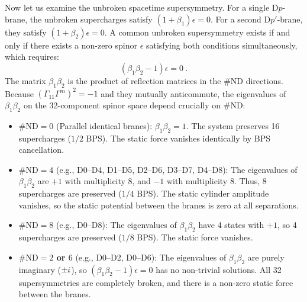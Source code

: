 Now let us examine the unbroken spacetime supersymmetry. For a single D$p$-brane, the unbroken supercharges satisfy $(1 + \beta_1)\epsilon = 0$. For a second D$p'$-brane, they satisfy $(1 + \beta_2)\epsilon = 0$. A common unbroken supersymmetry exists if and only if there exists a non-zero spinor $\epsilon$ satisfying both conditions simultaneously, which requires:
\begin{equation}
	(\beta_1\beta_2 - 1)\epsilon = 0 \:.
\end{equation}
The matrix $\beta_1\beta_2$ is the product of reflection matrices in the $\#\mathrm{ND}$ directions. Because $(\Gamma_{11}\Gamma^m)^2 = -1$ and they mutually anticommute, the eigenvalues of $\beta_1\beta_2$ on the 32-component spinor space depend crucially on $\#\mathrm{ND}$:
\begin{itemize}
	\item \textbf{$\#\mathrm{ND} = 0$} (Parallel identical branes): $\beta_1\beta_2 = 1$. The system preserves 16 supercharges ($1/2$ BPS). The static force vanishes identically by BPS cancellation.
	\item \textbf{$\#\mathrm{ND} = 4$} (e.g., D0--D4, D1--D5, D2--D6, D3--D7, D4--D8): The eigenvalues of $\beta_1\beta_2$ are $+1$ with multiplicity 8, and $-1$ with multiplicity 8. Thus, 8 supercharges are preserved ($1/4$ BPS). The static cylinder amplitude vanishes, so the static potential between the branes is zero at all separations.
	\item \textbf{$\#\mathrm{ND} = 8$} (e.g., D0--D8): The eigenvalues of $\beta_1\beta_2$ have 4 states with $+1$, so 4 supercharges are preserved ($1/8$ BPS). The static force vanishes.
	\item \textbf{$\#\mathrm{ND} = 2$ or $6$} (e.g., D0--D2, D0--D6): The eigenvalues of $\beta_1\beta_2$ are purely imaginary ($\pm i$), so $(\beta_1\beta_2 - 1)\epsilon = 0$ has no non-trivial solutions. All 32 supersymmetries are completely broken, and there is a non-zero static force between the branes.
\end{itemize}
